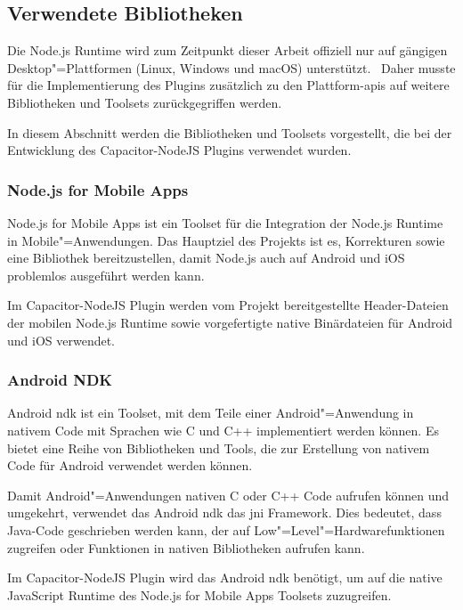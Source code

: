 \subsection{Verwendete Bibliotheken}

Die Node.js Runtime wird zum Zeitpunkt dieser Arbeit offiziell nur auf gängigen Desktop"=Plattformen (Linux, Windows und macOS) unterstützt.~\cite{nodejs}
Daher musste für die Implementierung des Plugins zusätzlich zu den Plattform-\acsp{api} auf weitere Bibliotheken und Toolsets zurückgegriffen werden.

In diesem Abschnitt werden die Bibliotheken und Toolsets vorgestellt, die bei der Entwicklung des Capacitor-NodeJS Plugins verwendet wurden.

\subsubsection{Node.js for Mobile Apps}

Node.js for Mobile Apps ist ein Toolset für die Integration der Node.js Runtime in Mobile"=Anwendungen.
Das Hauptziel des Projekts ist es, Korrekturen sowie eine Bibliothek bereitzustellen, damit Node.js auch auf Android und iOS problemlos ausgeführt werden kann.
\cite{nodejs-mobile, nodejs-mobile:docs}

Im Capacitor-NodeJS Plugin werden vom Projekt bereitgestellte Header-Dateien der mobilen Node.js Runtime sowie vorgefertigte native Binärdateien für Android und iOS verwendet.

\subsubsection{Android NDK}

Android \ac{ndk} ist ein Toolset, mit dem Teile einer Android"=Anwendung in nativem Code mit Sprachen wie C und C++ implementiert werden können.
Es bietet eine Reihe von Bibliotheken und Tools, die zur Erstellung von nativem Code für Android verwendet werden können.
\cite{android:ndk}

Damit Android"=Anwendungen nativen C oder C++ Code aufrufen können und umgekehrt, verwendet das Android \ac{ndk} das \ac{jni} Framework.
Dies bedeutet, dass Java-Code geschrieben werden kann, der auf Low"=Level"=Hardwarefunktionen zugreifen oder Funktionen in nativen Bibliotheken aufrufen kann.
\cite{android:ndk}

Im Capacitor-NodeJS Plugin wird das Android \ac{ndk} benötigt, um auf die native JavaScript Runtime des Node.js for Mobile Apps Toolsets zuzugreifen.
\cite{nodejs-mobile:docs}
